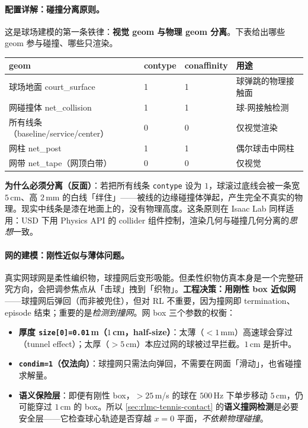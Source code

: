\paragraph{配置详解：碰撞分离原则。}这是球场建模的第一条铁律：\textbf{视觉 geom 与物理 geom 分离}。下表给出哪些 geom 参与碰撞、哪些只渲染。

\begin{center}
\small
\begin{tabular}{@{}llll@{}}
\toprule
geom & contype & conaffinity & 用途 \\
\midrule
球场地面 court\_surface & 1 & 1 & 球弹跳的物理接触面 \\
网碰撞体 net\_collision & 1 & 1 & 球-网接触检测 \\
所有线条（baseline/service/center） & 0 & 0 & 仅视觉渲染 \\
网柱 net\_post & 1 & 1 & 偶尔球击中网柱 \\
网带 net\_tape（网顶白带） & 0 & 0 & 仅视觉 \\
\bottomrule
\end{tabular}
\end{center}

\textbf{为什么必须分离（反面）}：若把所有线条 \verb|contype| 设为 $1$，球滚过底线会被一条宽 $5$\,cm、高 $2$\,mm 的白线「绊住」——被线的边缘碰撞体弹起，产生完全不真实的物理。现实中线条是漆在地面上的，没有物理高度。这条原则在 Isaac Lab 同样适用：USD 下用 Physics API 的 collider 组件控制，渲染几何与碰撞几何分离的\emph{思想}一致。

\paragraph{网的建模：刚性近似与薄体问题。}真实网球网是柔性编织物，球撞网后变形吸能。但柔性织物仿真本身是一个完整研究方向，会把调参焦点从「击球」拽到「织物」。\textbf{工程决策：用刚性 box 近似网}——球撞网后弹回（而非被兜住），但对 RL 不重要，因为撞网即 termination、episode 结束；重要的是\emph{检测到撞网}。网 box 三个参数的权衡：

\begin{itemize}
  \item \textbf{厚度 \texttt{size[0]=0.01}\,m（$1$\,cm，half-size）}：太薄（$<1$\,mm）高速球会穿过（tunnel effect）；太厚（$>5$\,cm）本应过网的球被过早拦截。$1$\,cm 是折中。
  \item \textbf{\texttt{condim=1}（仅法向）}：球撞网只需法向弹回，不需要在网面「滑动」，也省碰撞求解量。
  \item \textbf{语义保险层}：即便有刚性 box，$>25$\,m/s 的球在 $500$\,Hz 下单步移动 $5$\,cm，仍可能穿过 $1$\,cm 的 box。所以 \cref{sec:rlmc-tennis-contact} 的\textbf{语义撞网检测}是必要安全层——它检查球心轨迹是否穿越 $x=0$ 平面，\emph{不依赖物理碰撞}。
\end{itemize}

